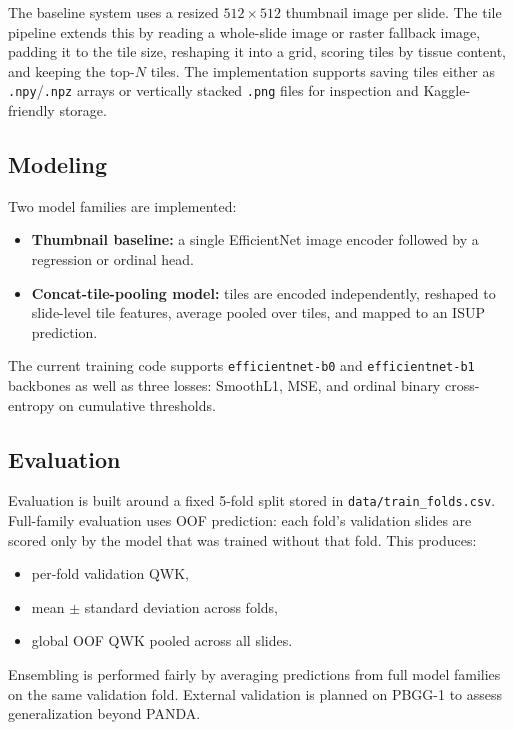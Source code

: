 \documentclass[11pt]{article}
\begin{document}
The baseline system uses a resized $512 \times 512$ thumbnail image per slide. The tile pipeline extends this by reading a whole-slide image or raster fallback image, padding it to the tile size, reshaping it into a grid, scoring tiles by tissue content, and keeping the top-$N$ tiles. The implementation supports saving tiles either as \texttt{.npy}/\texttt{.npz} arrays or vertically stacked \texttt{.png} files for inspection and Kaggle-friendly storage.

\subsection{Modeling}

Two model families are implemented:

\begin{itemize}[leftmargin=*]
    \item \textbf{Thumbnail baseline:} a single EfficientNet image encoder followed by a regression or ordinal head.
    \item \textbf{Concat-tile-pooling model:} tiles are encoded independently, reshaped to slide-level tile features, average pooled over tiles, and mapped to an ISUP prediction.
\end{itemize}

The current training code supports \texttt{efficientnet-b0} and \texttt{efficientnet-b1} backbones as well as three losses: SmoothL1, MSE, and ordinal binary cross-entropy on cumulative thresholds.

\subsection{Evaluation}

Evaluation is built around a fixed 5-fold split stored in \texttt{data/train\_folds.csv}. Full-family evaluation uses OOF prediction: each fold's validation slides are scored only by the model that was trained without that fold. This produces:

\begin{itemize}[leftmargin=*]
    \item per-fold validation QWK,
    \item mean $\pm$ standard deviation across folds,
    \item global OOF QWK pooled across all slides.
\end{itemize}

Ensembling is performed fairly by averaging predictions from full model families on the same validation fold. External validation is planned on PBGG-1 to assess generalization beyond PANDA.
\end{document}
